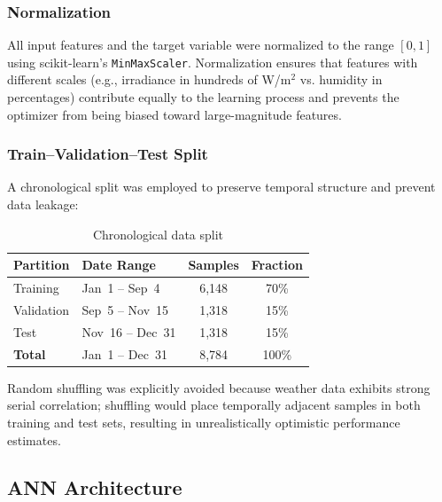 \documentclass[11pt, a4paper]{article}
\begin{document}
\subsubsection{Normalization}

All input features and the target variable were normalized to the range $[0, 1]$
using scikit-learn's \texttt{MinMaxScaler}. Normalization ensures that features
with different scales (e.g., irradiance in hundreds of W/m$^2$ vs. humidity in
percentages) contribute equally to the learning process and prevents the
optimizer from being biased toward large-magnitude features.

\subsubsection{Train--Validation--Test Split}

A chronological split was employed to preserve temporal structure and prevent
data leakage:

\begin{table}[H]
    \centering
    \caption{Chronological data split}\label{tab:split}
    \begin{tcolorbox}[colback=lightgray, colframe=rulecolor, boxrule=0.5pt, arc=4mm, auto outer arc, width=0.98\textwidth, halign=center]
        \renewcommand{\arraystretch}{1.5}
        \begin{tabular}{@{}llcc@{}}
        \toprule
        \textbf{Partition} & \textbf{Date Range} & \textbf{Samples} & \textbf{Fraction} \\
        \midrule
        Training & Jan~1 -- Sep~4 & 6,148 & 70\% \\
        Validation & Sep~5 -- Nov~15 & 1,318 & 15\% \\
        Test & Nov~16 -- Dec~31 & 1,318 & 15\% \\
        \midrule
        \textbf{Total} & Jan~1 -- Dec~31 & 8,784 & 100\% \\
        \bottomrule
        \end{tabular}
    \end{tcolorbox}
\end{table}

Random shuffling was explicitly avoided because weather data exhibits strong
serial correlation; shuffling would place temporally adjacent samples in both
training and test sets, resulting in unrealistically optimistic performance
estimates.

\subsection{ANN Architecture}
\end{document}
